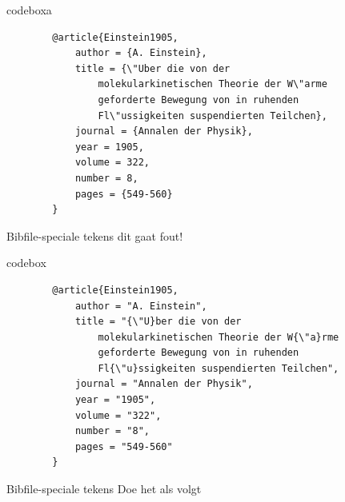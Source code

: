 
\begin{saveblock}{codeboxa}%
	\begin{verbatim}
		@article{Einstein1905,
			author = {A. Einstein},
			title = {\"Uber die von der
				molekularkinetischen Theorie der W\"arme
				geforderte Bewegung von in ruhenden
				Fl\"ussigkeiten suspendierten Teilchen},
			journal = {Annalen der Physik},
			year = 1905,
			volume = 322,
			number = 8,
			pages = {549-560}
		}
	\end{verbatim}
\end{saveblock}

\begin{frame}{Bibfile-speciale tekens}
	\huge{dit gaat fout!}
	\medskip
	
\end{frame}

\begin{saveblock}{codebox}%
	\begin{verbatim}
		@article{Einstein1905,
			author = "A. Einstein",
			title = "{\"U}ber die von der
				molekularkinetischen Theorie der W{\"a}rme
				geforderte Bewegung von in ruhenden
				Fl{\"u}ssigkeiten suspendierten Teilchen",
			journal = "Annalen der Physik",
			year = "1905",
			volume = "322",
			number = "8",
			pages = "549-560"
		}
	\end{verbatim}
\end{saveblock}


\begin{frame}{Bibfile-speciale tekens}
	\huge{Doe het als volgt}
	\medskip
	
\end{frame}
